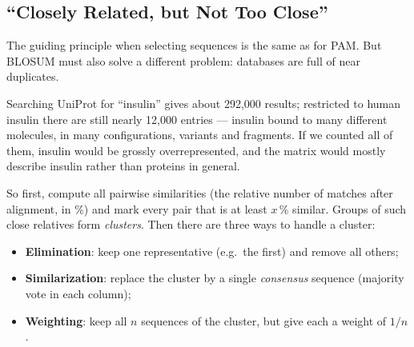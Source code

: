 \documentclass[11pt, oneside]{book}
\let\originalsubsection\subsection
\renewcommand{\subsection}{\Needspace{6\baselineskip}\originalsubsection}
\begin{document}
\subsection{``Closely Related, but Not Too Close''}

The guiding principle when selecting sequences is the same as for PAM. But
BLOSUM must also solve a different problem: databases are full of near
duplicates.

\begin{exbox}[title={12,000 human insulins}]
Searching UniProt for ``insulin'' gives about 292,000 results; restricted to
human insulin there are still nearly 12,000 entries --- insulin bound to many
different molecules, in many configurations, variants and fragments. If we
counted all of them, insulin would be grossly overrepresented, and the
matrix would mostly describe insulin rather than proteins in general.
\end{exbox}

So first, compute all pairwise similarities (the relative number of matches
after alignment, in \%) and mark every pair that is at least $x\,\%$ similar.
Groups of such close relatives form \emph{clusters}. Then there are three
ways to handle a cluster:

\begin{itemize}
  \item \textbf{Elimination}: keep one representative (e.g.\ the first) and
    remove all others;
  \item \textbf{Similarization}: replace the cluster by a single \emph{consensus}
    sequence (majority vote in each column);
  \item \textbf{Weighting}: keep all $n$ sequences of the cluster, but give each
    a weight of $1/n$.
\end{itemize}
\end{document}
